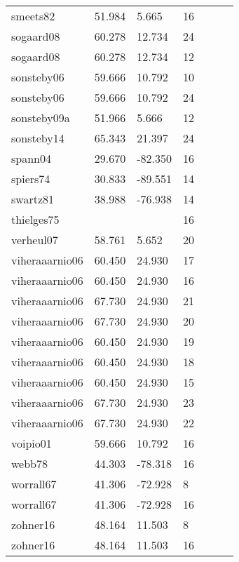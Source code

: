 \documentclass{article}
\begin{document}
\begin{table}[ht]
\begin{tabular}{|p{}|p{}|p{}|p{}|p{}|p{}|p{}|}
  smeets82 & 51.984 & 5.665 & 16 &  &  &  \\ 
  sogaard08 & 60.278 & 12.734 & 24 &  &  &  \\ 
  sogaard08 & 60.278 & 12.734 & 12 &  &  &  \\ 
  sonsteby06 & 59.666 & 10.792 & 10 &  &  &  \\ 
  sonsteby06 & 59.666 & 10.792 & 24 &  &  &  \\ 
  sonsteby09a & 51.966 & 5.666 & 12 &  &  &  \\ 
  sonsteby14 & 65.343 & 21.397 & 24 &  &  &  \\ 
  spann04 & 29.670 & -82.350 & 16 &  &  &  \\ 
  spiers74 & 30.833 & -89.551 & 14 &  &  &  \\ 
  swartz81 & 38.988 & -76.938 & 14 &  &  &  \\ 
  thielges75 &  &  & 16 &  &  &  \\ 
  verheul07 & 58.761 & 5.652 & 20 &  &  &  \\ 
  viheraaarnio06 & 60.450 & 24.930 & 17 &  &  &  \\ 
  viheraaarnio06 & 60.450 & 24.930 & 16 &  &  &  \\ 
  viheraaarnio06 & 67.730 & 24.930 & 21 &  &  &  \\ 
  viheraaarnio06 & 67.730 & 24.930 & 20 &  &  &  \\ 
  viheraaarnio06 & 60.450 & 24.930 & 19 &  &  &  \\ 
  viheraaarnio06 & 60.450 & 24.930 & 18 &  &  &  \\ 
  viheraaarnio06 & 60.450 & 24.930 & 15 &  &  &  \\ 
  viheraaarnio06 & 67.730 & 24.930 & 23 &  &  &  \\ 
  viheraaarnio06 & 67.730 & 24.930 & 22 &  &  &  \\ 
  voipio01 & 59.666 & 10.792 & 16 &  &  &  \\ 
  webb78 & 44.303 & -78.318 & 16 &  &  &  \\ 
  worrall67 & 41.306 & -72.928 & 8 &  &  &  \\ 
  worrall67 & 41.306 & -72.928 & 16 &  &  &  \\ 
  zohner16 & 48.164 & 11.503 & 8 &  &  &  \\ 
  zohner16 & 48.164 & 11.503 & 16 &  &  &  \\ 
   \hline
\end{tabular}
\end{table}\clearpage
\end{document}
